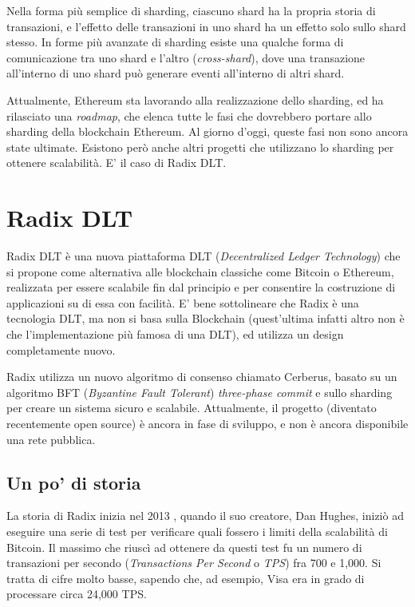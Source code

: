 Nella forma più semplice di sharding, ciascuno shard ha la propria storia di transazioni, e l'effetto delle transazioni in uno shard ha un effetto solo sullo shard stesso. In forme più avanzate di sharding esiste una qualche forma di comunicazione tra uno shard e l'altro (\textit{cross-shard}), dove una transazione all'interno di uno shard può generare eventi all'interno di altri shard.

Attualmente, Ethereum sta lavorando alla realizzazione dello sharding, ed ha rilasciato una \textit{roadmap}, che elenca tutte le fasi che dovrebbero portare allo sharding della blockchain Ethereum. Al giorno d'oggi, queste fasi non sono ancora state ultimate. Esistono però anche altri progetti che utilizzano lo sharding per ottenere scalabilità. E' il caso di Radix DLT.

\section{Radix DLT}

Radix DLT è una nuova piattaforma DLT (\textit{Decentralized Ledger Technology}) che si propone come alternativa alle blockchain classiche come Bitcoin o Ethereum, realizzata per essere scalabile fin dal principio e per consentire la costruzione di applicazioni su di essa con facilità. E' bene sottolineare che Radix è una tecnologia DLT, ma non si basa sulla Blockchain (quest'ultima infatti altro non è che l'implementazione più famosa di una DLT), ed utilizza un design completamente nuovo.

Radix utilizza un nuovo algoritmo di consenso chiamato Cerberus, basato su un algoritmo BFT (\textit{Byzantine Fault Tolerant}) \textit{three-phase commit} e sullo sharding per creare un sistema sicuro e scalabile. Attualmente, il progetto (diventato recentemente open source) è ancora in fase di sviluppo, e non è ancora disponibile una rete pubblica.

\subsection{Un po' di storia}

La storia di Radix inizia nel 2013 \cite{K12}, quando il suo creatore, Dan Hughes, iniziò ad eseguire una serie di test per verificare quali fossero i limiti della scalabilità di Bitcoin. Il massimo che riuscì ad ottenere da questi test fu un numero di transazioni per secondo (\textit{Transactions Per Second} o \textit{TPS}) fra 700 e 1,000. Si tratta di cifre molto basse, sapendo che, ad esempio, Visa era in grado di processare circa 24,000 TPS. 

